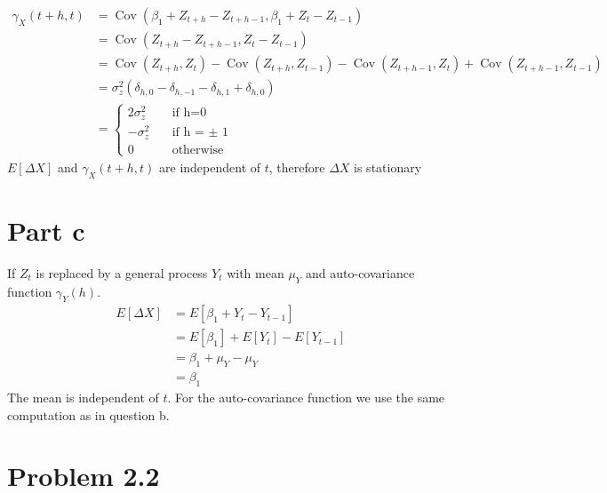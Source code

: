 \documentclass[11pt, oneside]{article}   	%
\newcommand{\Cov}{\operatorname{Cov}}
\begin{document}
\begin{equation}
\begin{aligned}
\gamma_{X}(t+h,t) &= \Cov(\beta_{1} + Z_{t+h} - Z_{t+h-1},\beta_{1} + Z_{t} - Z_{t-1})\\
&=\Cov( Z_{t+h} - Z_{t+h-1}, Z_{t} - Z_{t-1})\\
&= \Cov( Z_{t+h},Z_{t}) - \Cov( Z_{t+h},Z_{t-1}) -\Cov( Z_{t+h-1},Z_{t}) +\Cov( Z_{t+h-1},Z_{t-1}) \\
&=\sigma_{z}^{2}( \delta_{h,0} - \delta_{h,-1} - \delta_{h,1} + \delta_{h,0})\\
& = 
     \begin{cases}
       2\sigma_{z}^{2} &\quad\text{if h=0}\\
       -\sigma_{z}^{2}&\quad\text{if h = $\pm$ 1} \\
       0 &\quad\text{otherwise}
     \end{cases}
\end{aligned}
\end{equation}
$E[\Delta X]$ and $\gamma_{X}(t+h,t)$ are independent of $t$, therefore $\Delta X$ is stationary

\section{Part c}
If $Z_{t}$ is replaced by a general process $Y_{t}$ with mean $\mu_{Y}$ and auto-covariance function $\gamma_{Y}(h)$.
\begin{equation}
\begin{aligned}
E[\Delta X] &= E[\beta_{1} + Y_{t} - Y_{t-1}]\\
&=E[\beta_{1}]+E[Y_{t}] -E[Y_{t-1}] \\
&=\beta_{1}+\mu_{Y} -\mu_{Y} \\
&=\beta_{1}
\end{aligned}
\end{equation}
The mean is independent of $t$. For the auto-covariance function we use the same computation as in question b.









\section{Problem 2.2}
\end{document}
